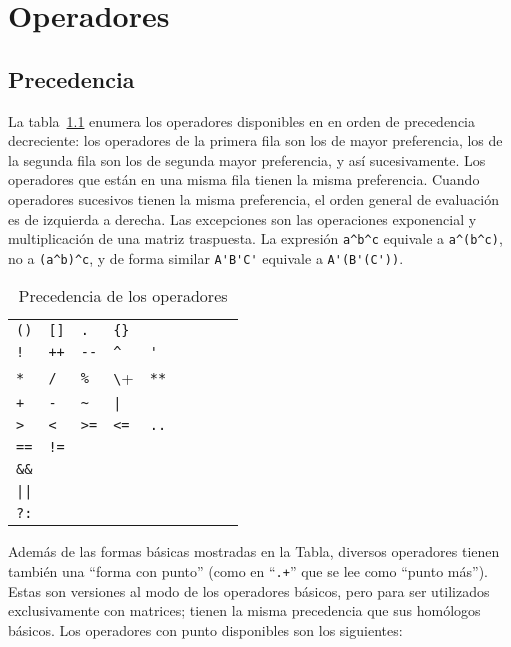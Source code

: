 \chapter{Operadores}
\label{chap:operators}

\section{Precedencia}

La tabla~\ref{tab:ops} enumera los operadores disponibles en  en
orden de precedencia decreciente: los operadores de la primera fila son los de
mayor preferencia, los de la segunda fila son los de segunda mayor preferencia,
y así sucesivamente. Los operadores que están en una misma fila tienen la misma
preferencia. Cuando operadores sucesivos tienen la misma preferencia, el orden
general de evaluación es de izquierda a derecha. Las excepciones son las
operaciones exponencial y multiplicación de una matriz traspuesta. La expresión
\verb|a^b^c| equivale a \verb|a^(b^c)|, no a \verb|(a^b)^c|, y de forma similar
\verb|A'B'C'| equivale a \verb|A'(B'(C'))|.

\begin{table}[htbp]
\caption{Precedencia de los operadores}
\label{tab:ops}
\begin{center}
\begin{tabular}{lllllllll}
\verb|()| & \verb|[]| & \texttt{.} & \verb|{}| \\
\texttt{!} & \texttt{++} & \verb|--| & \verb|^| & \verb|'| \\
\texttt{*} & \texttt{/} & \texttt{\%} & \verb+\+ & \texttt{**} \\
\texttt{+} & \texttt{-} & \verb|~| & \verb+|+ & \\
\verb|>| & \verb|<| & \verb|>=| & \verb|<=| & \texttt{..} \\
\texttt{==} & \texttt{!=} \\
\verb|&&| \\
\verb+||+ \\
\texttt{?:} \\
\end{tabular}
\end{center}
\end{table}

Además de las formas básicas mostradas en la Tabla, diversos operadores tienen
también una ``forma con punto'' (como en ``\texttt{.+}'' que se lee como
``punto más''). Estas son versiones al modo de los operadores básicos, pero
para ser utilizados exclusivamente con matrices; tienen la misma precedencia que
sus homólogos básicos. Los operadores con punto disponibles son los siguientes:

